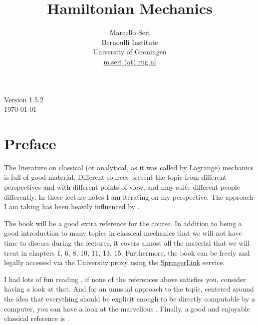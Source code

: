 \documentclass[english,fontsize=11pt,paper=a5,oneside]{scrbook}
\title{Hamiltonian Mechanics}
\author{Marcello Seri\\
\small{Bernoulli Institute}\vspace{-.2cm}\\
\small{University of Groningen}\vspace{-.2cm}\\
\small\href{mailto:m.seri@rug.nl}{m.seri (at) rug.nl}
}
\date{}
\theoremstyle{definition}
\def\biblio{}
\begin{document}
\def\biblio{}

\maketitle

\cleardoublepage

\thispagestyle{empty}
\null\vfill
\begin{center}
  Version 1.5.2\\
  \today
\end{center}
\vfill
\small{\doclicenseThis}

\cleardoublepage

\tableofcontents

\cleardoublepage

\chapter*{Preface}

The literature on classical (or analytical, as it was called by Lagrange) mechanics is full of good material.
Different sources present the topic from different perspectives and with different points of view, and may suite different people differently.
In these lecture notes I am iterating on my perspective.
The approach I am taking has been heavily influenced by \cite{book:arnold, book:knauf, lectures:dubrovin, book:lowenstein, book:marsdenratiu, lectures:tong, landau1976mechanics}.

The book \cite{book:knauf} will be a good extra reference for the course. In addition to being a good introduction to many topics in classical mechanics that we will not have time to discuss during the lectures, it covers almost all the material that we will treat in chapters 1, 6, 8, 10, 11, 13, 15. Furthermore, the book can be freely and legally accessed via the University proxy using the \href{https://link.springer.com/book/10.1007%2F978-3-662-55774-7}{SpringerLink} service.

I had lots of fun reading \cite{schwichtenberg2019no}, if none of the references above satisfies you, consider having a look at that. And for an unusual approach to the topic, centered around the idea that everything should be explicit enough to be directly computable by a computer, you can have a look at the marvellous \cite{book:sicm}. Finally, a good and enjoyable classical reference is \cite{goldstein2013classical}.\medskip
\end{document}
